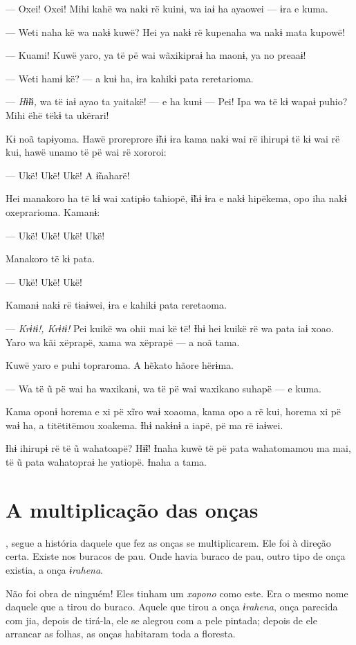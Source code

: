 --- Oxei! Oxei! Mihi kahë wa nakɨ rë kuinɨ, wa iaɨ ha ayaowei --- ɨra e
kuma. 

--- Weti naha kë wa nakɨ kuwë? Hei ya nakɨ rë kupenaha wa nakɨ mata
kupowë! 

--- Kuami! Kuwë yaro, ya të pë wai wãxikipraɨ ha maonɨ, ya no preaaɨ! 

--- Weti hamɨ kë? --- a kuɨ ha, ɨra kahikɨ pata reretarioma.

--- \textit{Hɨ̃ɨɨ,} wa të iaɨ ayao ta yaitakë! --- e ha kunɨ --- Pei! Ipa wa të kɨ
wapaɨ puhio? Mihi ëhë tëkɨ ta ukërari! 

Kɨ noã tapɨyoma. Hawë proreprore ɨ̃hɨ ɨra kama nakɨ wai rë ihirupɨ të kɨ
wai rë kui, hawë unamo të pë wai rë xororoi: 

--- Ukë! Ukë! Ukë! A ɨ̃naharë! 

Hei manakoro ha të kɨ wai xatipɨo tahiopë, ɨ̃hɨ ɨra e nakɨ hipëkema, opo
iha nakɨ oxeprarioma. Kamanɨ: 

--- Ukë! Ukë! Ukë! Ukë! 

Manakoro të kɨ pata. 

--- Ukë! Ukë! Ukë! 

Kamanɨ nakɨ rë tɨaɨwei, ɨra e kahikɨ pata reretaoma. 

--- \textit{Krɨtɨ!, Krɨtɨ!} Pei kuikë wa ohii mai kë të! Ɨhɨ hei kuikë rë wa pata
iaɨ xoao. Yaro wa kãi xëprapë, xama wa xëprapë --- a noã tama. 

Kuwë yaro e puhi topraroma. A hẽkato hãore hërɨma. 

--- Wa të ũ pë wai ha waxikanɨ, wa të pë wai waxikano suhapë --- e
kuma. 

Kama oponɨ horema e xi pë xĩro waɨ xoaoma, kama opo a rë kui, horema xi
pë waɨ ha, a titëtitëmou xoakema. Ɨhɨ nakɨnɨ a iapë, pë ma rë iaɨwei. 

Ɨhɨ ihirupɨ rë të ũ wahatoapë? Hɨ̃ɨ! Ɨnaha kuwë të pë pata wahatomamou ma
mai, të ũ pata wahatopraɨ he yatiopë. Ɨnaha a tama. 
 
\chapter{A multiplicação das onças}

, segue a história daquele que fez as onças se multiplicarem.
Ele foi à direção certa. Existe nos buracos de pau. Onde havia buraco de
pau, outro tipo de onça existia, a onça \textit{ɨrahena}. 

Não foi obra de ninguém! Eles tinham um \textit{xapono} como este. Era o mesmo nome
daquele que a tirou do buraco. Aquele que tirou a onça \textit{ɨrahena},
onça parecida com jia, depois de tirá-la, ele se alegrou com a pele
pintada; depois de ele arrancar as folhas, as onças habitaram toda a
floresta. 


